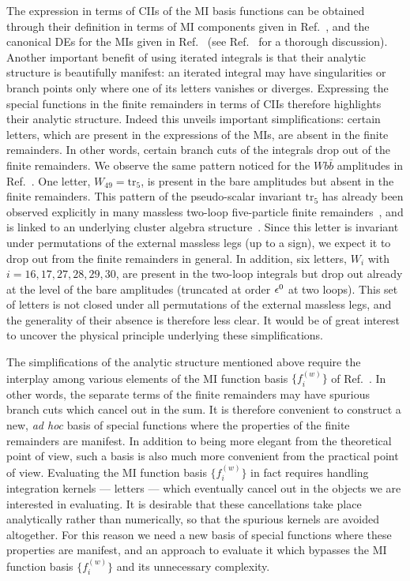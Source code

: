 \documentclass[main.tex]{subfiles}
\begin{document}
The expression in terms of CIIs of the MI basis functions can be obtained through their definition in terms of MI components given in Ref.~\cite{Badger:2021nhg}, and the canonical DEs for the MIs given in Ref.~\cite{Abreu:2020jxa} (see Ref.~\cite{Badger:2021nhg} for a thorough discussion). Another important benefit of using iterated integrals is that their analytic structure is beautifully manifest: an iterated integral may have singularities or branch points only where one of its letters vanishes or diverges. Expressing the special functions in the finite remainders in terms of CIIs therefore highlights their analytic structure. Indeed this unveils important simplifications: certain letters, which are present in the expressions of the MIs, are absent in the finite remainders. In other words, certain branch cuts of the integrals drop out of the finite remainders. We observe the same pattern noticed for the $Wb\bar{b}$ amplitudes in Ref.~\cite{Badger:2021nhg}. One letter, $W_{49} = \text{tr}_5$, is present in the bare amplitudes but absent in the finite remainders. This pattern of the pseudo-scalar invariant $\text{tr}_5$ has already been observed explicitly in many massless two-loop five-particle finite remainders~\cite{Badger:2018enw,Abreu:2018zmy,Abreu:2018aqd,Chicherin:2018yne,Chicherin:2019xeg,Abreu:2019rpt,Abreu:2019odu,Badger:2019djh,Caron-Huot:2020vlo,Abreu:2020cwb,Chawdhry:2020for}, and is linked to an underlying cluster algebra structure~\cite{Chicherin:2020umh}. Since this letter is invariant under permutations of the external massless legs (up to a sign), we expect it to drop out from the finite remainders in general.
In addition, six letters, $W_i$ with $i=16,17,27,28,29,30$, are present in the two-loop integrals but drop out already at the level of the bare amplitudes (truncated at order $\epsilon^0$ at two loops). This set of letters is not closed under all permutations of the external massless legs, and the generality of their absence is therefore less clear.
It would be of great interest to uncover the physical principle underlying these simplifications.

The simplifications of the analytic structure mentioned above require the interplay among various elements of the MI function basis $\{f^{(w)}_i\}$ of Ref.~\cite{Badger:2021nhg}. In other words, the separate terms of the finite remainders may have spurious branch cuts which cancel out in the sum. It is therefore convenient to construct a new, \textit{ad hoc} basis of special functions where the properties of the finite remainders are manifest. In addition to being more elegant from the theoretical point of view, such a basis is also much more convenient from the practical point of view. Evaluating the MI function basis $\{f^{(w)}_i\}$ in fact requires handling integration kernels --- letters --- which eventually cancel out in the objects we are interested in evaluating. It is desirable that these cancellations take place analytically rather than numerically, so that the spurious kernels are avoided altogether. For this reason we need a new basis of special functions where these properties are manifest, and an approach to evaluate it which bypasses the MI function basis $\{f^{(w)}_i\}$ and its unnecessary complexity.
\end{document}
